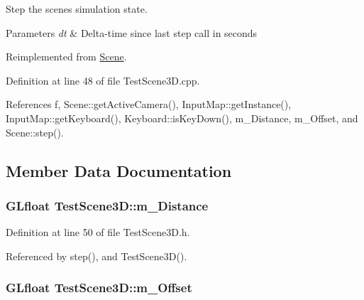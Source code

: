 Step the scene\textquotesingle{}s simulation state. 


\begin{DoxyParams}{Parameters}
{\em dt} & Delta-\/time since last step call in seconds \\
\hline
\end{DoxyParams}


Reimplemented from \hyperlink{class_scene_aa9597b193a1cd70a276ca2480c01adea}{Scene}.



Definition at line 48 of file Test\+Scene3\+D.\+cpp.



References f, Scene\+::get\+Active\+Camera(), Input\+Map\+::get\+Instance(), Input\+Map\+::get\+Keyboard(), Keyboard\+::is\+Key\+Down(), m\+\_\+\+Distance, m\+\_\+\+Offset, and Scene\+::step().



\subsection{Member Data Documentation}
\subsubsection[{\texorpdfstring{m\+\_\+\+Distance}{m_Distance}}]{\setlength{\rightskip}{0pt plus 5cm}G\+Lfloat Test\+Scene3\+D\+::m\+\_\+\+Distance\hspace{0.3cm}{\ttfamily [private]}}\hypertarget{class_test_scene3_d_ad645a73819745449c00db8b800417565}{}\label{class_test_scene3_d_ad645a73819745449c00db8b800417565}


Definition at line 50 of file Test\+Scene3\+D.\+h.



Referenced by step(), and Test\+Scene3\+D().

\subsubsection[{\texorpdfstring{m\+\_\+\+Offset}{m_Offset}}]{\setlength{\rightskip}{0pt plus 5cm}G\+Lfloat Test\+Scene3\+D\+::m\+\_\+\+Offset\hspace{0.3cm}{\ttfamily [private]}}\hypertarget{class_test_scene3_d_ac4a67a6b4358d147b417c4dcf9735ad4}{}\label{class_test_scene3_d_ac4a67a6b4358d147b417c4dcf9735ad4}


